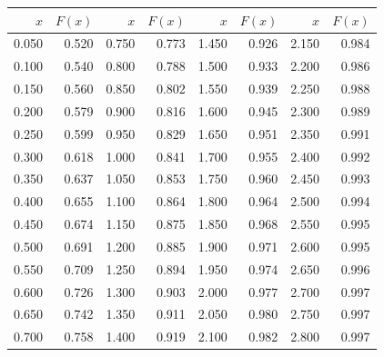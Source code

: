 \documentclass[addpoints, answers]{exam} %
\begin{document}
\begin{figure}[b]
\begin{minipage}[b]{0.35\linewidth}
\begin{tikzpicture}
\end{tikzpicture}
\par\vspace{0pt}
  \end{minipage}%
  \begin{minipage}[b]{0.60\linewidth}
    \centering
\begin{tabular}{rr|rr|rr|rr}
  \hline
$x$ & $F(x)$ & $x$ & $F(x)$ & $x$ & $F(x)$ & $x$ & $F(x)$ \\
  \hline
0.050 & 0.520 & 0.750 & 0.773 & 1.450 & 0.926 & 2.150 & 0.984 \\
  0.100 & 0.540 & 0.800 & 0.788 & 1.500 & 0.933 & 2.200 & 0.986 \\
  0.150 & 0.560 & 0.850 & 0.802 & 1.550 & 0.939 & 2.250 & 0.988 \\
  0.200 & 0.579 & 0.900 & 0.816 & 1.600 & 0.945 & 2.300 & 0.989 \\
  0.250 & 0.599 & 0.950 & 0.829 & 1.650 & 0.951 & 2.350 & 0.991 \\
  0.300 & 0.618 & 1.000 & 0.841 & 1.700 & 0.955 & 2.400 & 0.992 \\
  0.350 & 0.637 & 1.050 & 0.853 & 1.750 & 0.960 & 2.450 & 0.993 \\
  0.400 & 0.655 & 1.100 & 0.864 & 1.800 & 0.964 & 2.500 & 0.994 \\
  0.450 & 0.674 & 1.150 & 0.875 & 1.850 & 0.968 & 2.550 & 0.995 \\
  0.500 & 0.691 & 1.200 & 0.885 & 1.900 & 0.971 & 2.600 & 0.995 \\
  0.550 & 0.709 & 1.250 & 0.894 & 1.950 & 0.974 & 2.650 & 0.996 \\
  0.600 & 0.726 & 1.300 & 0.903 & 2.000 & 0.977 & 2.700 & 0.997 \\
  0.650 & 0.742 & 1.350 & 0.911 & 2.050 & 0.980 & 2.750 & 0.997 \\
  0.700 & 0.758 & 1.400 & 0.919 & 2.100 & 0.982 & 2.800 & 0.997 \\
   \hline
\end{tabular}
\par\vspace{0pt}
\end{minipage}
\label{fig:test}
\end{figure}
\end{document}
